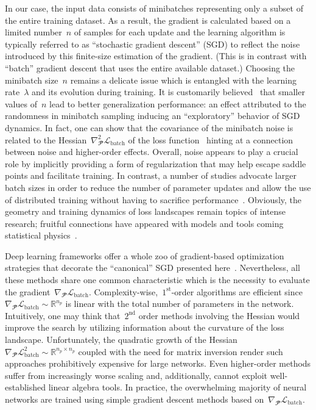 \documentclass{article}
\begin{document}
\begin{enumerate}
In our case, the input data consists of minibatches representing only a subset of the entire training dataset.  As a result, the gradient is calculated based on a limited number~$n$ of samples for each update and the learning algorithm is typically referred to as ``stochastic gradient descent'' (SGD) to reflect the noise introduced by this finite-size estimation of the gradient.  (This is in contrast with ``batch'' gradient descent that uses the entire available dataset.)  Choosing the minibatch size~$n$ remains a delicate issue which is entangled with the learning rate~$\lambda$ and its evolution during training.  It is customarily believed~\cite{YannLeCun_tweet,graphCoreAI} that smaller values of~$n$ lead to better generalization performance:  an effect attributed to the randomness in minibatch sampling inducing an ``exploratory'' behavior of SGD dynamics.  In fact, one can show that the covariance of the minibatch noise is related to the Hessian~$\nabla^2_\mathbfcal{P} \mathcal{L}_\text{batch}$ of the loss function~\cite{limitCycles} hinting at a connection between noise and higher-order effects.  Overall, noise appears to play a crucial role by implicitly providing a form of regularization that may help escape saddle points and facilitate training. In contrast, a number of studies advocate larger batch sizes in order to reduce the number of parameter updates and allow the use of distributed training without having to sacrifice performance~\cite{largeBatch1,largeBatch2,largeBatch3}.  Obviously, the geometry and training dynamics of loss landscapes remain topics of intense research; fruitful connections have appeared with models and tools coming statistical physics~\cite{lossSurface}.

Deep learning frameworks offer a whole zoo of gradient-based optimization strategies that decorate the ``canonical'' SGD presented here~\cite{ruderGradient,adaptiveMethods}.  Nevertheless, all these methods share one common characteristic which is the necessity to evaluate the gradient~$\nabla_\mathbfcal{P} \mathcal{L}_\text{batch}$.  Complexity-wise,~$1^\text{st}$-order algorithms are efficient since~$\nabla_\mathbfcal{P} \mathcal{L}_\text{batch} \sim \mathbb{R}^{n_p}$ is linear with the total number of parameters in the network.  Intuitively, one may think that~$2^\text{nd}$ order methods involving the Hessian would improve the search by utilizing information about the curvature of the loss landscape.  Unfortunately, the quadratic growth of the Hessian~$\nabla_\mathbfcal{P} \mathcal{L}_\text{batch}^2 \sim \mathbb{R}^{n_p \times n_p}$ coupled with the need for matrix inversion render such approaches prohibitively expensive for large networks. Even higher-order methods suffer from increasingly worse scaling and, additionally, cannot exploit well-established linear algebra tools.  In practice, the overwhelming majority of neural networks are trained using simple gradient descent methods based on~$\nabla_\mathbfcal{P} \mathcal{L}_\text{batch}$.


\end{enumerate}
\end{document}
